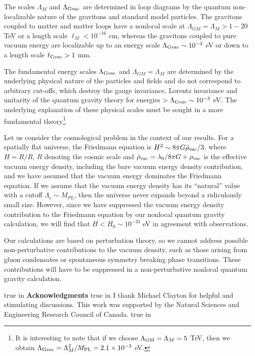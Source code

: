 \documentclass[a4paper,11pt]{article}
\begin{document}
The scales $\Lambda_M$ and $\Lambda_{{\rm Gvac}}$ are determined in
loop diagrams by the quantum non-localizable nature of the gravitons and
standard model particles. The gravitons coupled to matter and matter
loops have a nonlocal scale at $\Lambda_{GM}=\Lambda_M > 1-20$ TeV or a
length scale $\ell_M < 10^{-16}$ cm, whereas the gravitons coupled to
pure vacuum energy are localizable up to an energy scale
$\Lambda_{{\rm Gvac}}\sim 10^{-3}$ eV or down to a length scale $\ell_{{\rm Gvac}} > 1$
mm.

The fundamental energy scales $\Lambda_{{\rm Gvac}}$ and
$\Lambda_{GM}=\Lambda_M$ are determined by the underlying physical nature
of the particles and fields and do not correspond to arbitrary cut-offs,
which destroy the gauge invariance, Lorentz invariance and unitarity of the
quantum gravity theory for energies $>\Lambda_{{\rm Gvac}}\sim 10^{-3}$ eV.
The underlying explanation of these physical scales must be sought in a
more fundamental theory\footnote{It is interesting to note that if we
choose $\Lambda_{\rm GM}=\Lambda_M=5$ TeV, then we obtain
$\Lambda_{\rm Gvac}=\Lambda_M^2/M_{\rm PL}=2.1\times 10^{-3}$
eV.}

Let us consider the cosmological problem in the context of our
results. For a spatially flat universe, the Friedmann equation
is
$\label{Friedmann}
H^2\sim 8\pi G{\bar\rho}_{\rm vac}/3$,
where $H={\dot R}/R$, $R$ denoting the cosmic
scale and ${\bar\rho}_{\rm vac}=\lambda_0/8\pi
G+\rho_{\rm vac}$ is the effective vacuum energy density,
including the bare vacuum energy density contribution, and we
have assumed that the vacuum energy dominates the Friedmann
equation. If we assume that the vacuum energy density has its
``natural'' value with a cutoff $\Lambda_c\sim  M_{PL}$, then the
universe never expands beyond a ridiculously small size.
However, since we have suppressed the vacuum energy density
contribution to the Friedmann equation by our nonlocal quantum
gravity calculation, we will find that
$H < H_0\sim 10^{-33}$ eV in agreement with observations.

Our calculations are based on perturbation theory, so we cannot
address possible non-perturbative contributions to the vacuum
density, such as those arising from gluon condensates or
spontaneous symmetry breaking phase transitions. These
contributions will have to be suppressed in a non-perturbative
nonlocal quantum gravity calculation.

 true in
{\bf Acknowledgments}
 true in
I thank Michael Clayton for helpful and
stimulating discussions. This work was supported by the Natural Sciences and
Engineering Research Council of Canada.   true in
\end{document}
